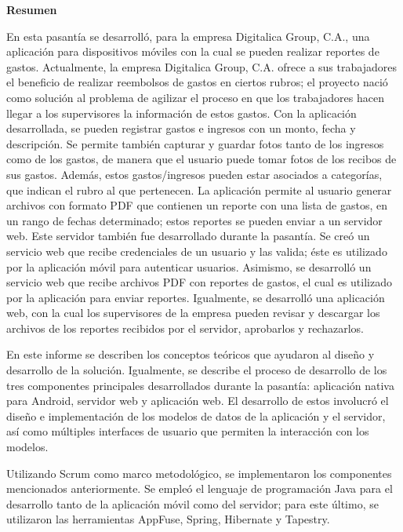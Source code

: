 \setcounter{page}{3}
\begin{center}
	{\bf Resumen}  %
\end{center}	

En esta pasantía se desarrolló, para la empresa Digitalica Group, C.A., una aplicación para dispositivos móviles con la cual se pueden realizar reportes de gastos. Actualmente, la empresa Digitalica Group, C.A. ofrece a sus trabajadores el beneficio de realizar reembolsos de gastos en ciertos rubros; el proyecto nació como solución al problema de agilizar el proceso en que los trabajadores hacen llegar a los supervisores la información de estos gastos. Con la aplicación desarrollada, se pueden registrar gastos e ingresos con un monto, fecha y descripción. Se permite también capturar y guardar fotos tanto de los ingresos como de los gastos, de manera que el usuario puede tomar fotos de los recibos de sus gastos. Además, estos gastos/ingresos pueden estar asociados a categorías, que indican el rubro al que pertenecen. La aplicación permite al usuario generar archivos con formato PDF que contienen un reporte con una lista de gastos, en un rango de fechas determinado; estos reportes se pueden enviar a un servidor web. Este servidor también fue desarrollado durante la pasantía. Se creó un servicio web que recibe credenciales de un usuario y las valida; éste es utilizado por la aplicación móvil para autenticar usuarios. Asimismo, se desarrolló un servicio web que recibe archivos PDF con reportes de gastos, el cual es utilizado por la aplicación para enviar reportes. Igualmente, se desarrolló una aplicación web, con la cual los supervisores de la empresa pueden revisar y descargar los archivos de los reportes recibidos por el servidor, aprobarlos y rechazarlos.

En este informe se describen los conceptos teóricos que ayudaron al diseño y desarrollo de la solución. Igualmente, se describe el proceso de desarrollo de los tres componentes principales desarrollados durante la pasantía: aplicación nativa para Android, servidor web y aplicación web. El desarrollo de estos involucró el diseño e implementación de los modelos de datos de la aplicación y el servidor, así como múltiples interfaces de usuario que permiten la interacción con los modelos. 

Utilizando Scrum como marco metodológico, se implementaron los componentes mencionados anteriormente. Se empleó el lenguaje de programación Java para el desarrollo tanto de la aplicación móvil como del servidor; para este último, se utilizaron las herramientas AppFuse, Spring, Hibernate y Tapestry.


